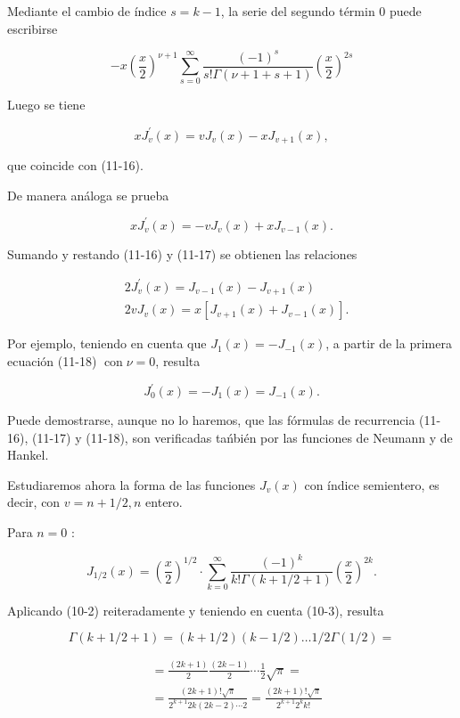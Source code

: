 \documentclass[10pt]{article}
\theoremstyle{plain}
\theoremstyle{definition}
\theoremstyle{remark}
\begin{document}
Mediante el cambio de índice $s=k-1$, la serie del segundo términ 0 puede escribirse

$$
-x\left(\frac{x}{2}\right)^{\nu+1} \sum_{s=0}^{\infty} \frac{(-1)^{s}}{s!\Gamma(\nu+1+s+1)}\left(\frac{x}{2}\right)^{2 s}
$$

Luego se tiene

$$
x J_{v}^{\prime}(x)=v J_{v}(x)-x J_{v+1}(x),
$$

que coincide con (11-16).

De manera análoga se prueba


\begin{equation*}
x J_{v}^{\prime}(x)=-v J_{v}(x)+x J_{v-1}(x) . \tag{11-17}
\end{equation*}


Sumando y restando (11-16) y (11-17) se obtienen las relaciones


\begin{align*}
& 2 J_{v}^{\prime}(x)=J_{v-1}(x)-J_{v+1}(x)  \tag{11-18}\\
& 2 v J_{v}(x)=x\left[J_{v+1}(x)+J_{v-1}(x)\right] . \tag{11-18}
\end{align*}


Por ejemplo, teniendo en cuenta que $J_{1}(x)=-J_{-1}(x)$, a partir de la primera ecuación (11-18) $\operatorname{con} \nu=0$, resulta

$$
J_{0}^{\prime}(x)=-J_{1}(x)=J_{-1}(x) .
$$

Puede demostrarse, aunque no lo haremos, que las fórmulas de recurrencia (11-16), (11-17) y (11-18), son verificadas tańbién por las funciones de Neumann y de Hankel.

Estudiaremos ahora la forma de las funciones $J_{v}(x)$ con índice semientero, es decir, con $v=n+1 / 2, n$ entero.

Para $n=0$ :


\begin{equation*}
J_{1 / 2}(x)=\left(\frac{x}{2}\right)^{1 / 2} \cdot \sum_{k=0}^{\infty} \frac{(-1)^{k}}{k!\Gamma(k+1 / 2+1)}\left(\frac{x}{2}\right)^{2 k} . \tag{11-19}
\end{equation*}


Aplicando (10-2) reiteradamente y teniendo en cuenta (10-3), resulta

$$
\Gamma(k+1 / 2+1)=(k+1 / 2)(k-1 / 2) \ldots 1 / 2 \Gamma(1 / 2)=
$$

$$
\begin{aligned}
& =\frac{(2 k+1)}{2} \frac{(2 k-1)}{2} \cdots \frac{1}{2} \sqrt{\pi}= \\
& =\frac{(2 k+1)!\sqrt{\pi}}{2^{k+1} 2 k(2 k-2) \cdots 2}=\frac{(2 k+1)!\sqrt{\pi}}{2^{k+1} 2^{k} k!}
\end{aligned}
$$
\end{document}
